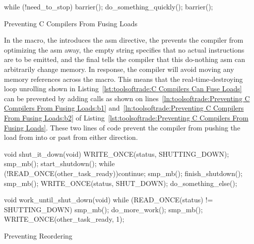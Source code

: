 \begin{listing}[tbp]
\begin{fcvlabel}
\begin{VerbatimL}[commandchars=\\\[\]]
while (!need_to_stop) {
	barrier(); \lnlbl[b1]
	do_something_quickly();
	barrier(); \lnlbl[b2]
}
\end{VerbatimL}
\end{fcvlabel}
\caption{Preventing C Compilers From Fusing Loads}
\label{lst:toolsoftrade:Preventing C Compilers From Fusing Loads}
\end{listing}

In the  macro, the  introduces the asm
directive, the  prevents the compiler from optimizing
the asm away, the empty string specifies that no actual instructions
are to be emitted, and the final  tells the compiler that
this do-nothing asm can arbitrarily change memory.
In response, the compiler will avoid moving any memory references across
the  macro.
This means that the real-time-destroying loop unrolling shown in
Listing~\ref{lst:toolsoftrade:C Compilers Can Fuse Loads}
can be prevented by adding  calls as shown on
lines~\ref{ln:toolsoftrade:Preventing C Compilers From Fusing Loads:b1}
and~\ref{ln:toolsoftrade:Preventing C Compilers From Fusing Loads:b2}
of
Listing~\ref{lst:toolsoftrade:Preventing C Compilers From Fusing Loads}.
These two lines of code prevent the compiler from pushing the load from
 into or past  from either
direction.

\begin{listing}[tbp]
\begin{fcvlabel}
\begin{VerbatimL}[commandchars=\\\[\]]
void shut_it_down(void)
{
	WRITE_ONCE(status, SHUTTING_DOWN);
	smp_mb(); \lnlbl[mb1]
	start_shutdown();
	while (!READ_ONCE(other_task_ready))\lnlbl[loop:b]
		continue;
	smp_mb(); \lnlbl[mb2]
	finish_shutdown();
	smp_mb(); \lnlbl[mb3]
	WRITE_ONCE(status, SHUT_DOWN);
	do_something_else();
}

void work_until_shut_down(void)
{
	while (READ_ONCE(status) != SHUTTING_DOWN) {
		smp_mb(); \lnlbl[mb4]
		do_more_work();
	}
	smp_mb(); \lnlbl[mb5]
	WRITE_ONCE(other_task_ready, 1);
}
\end{VerbatimL}
\end{fcvlabel}
\caption{Preventing Reordering}
\label{lst:toolsoftrade:Preventing Reordering}
\end{listing}

